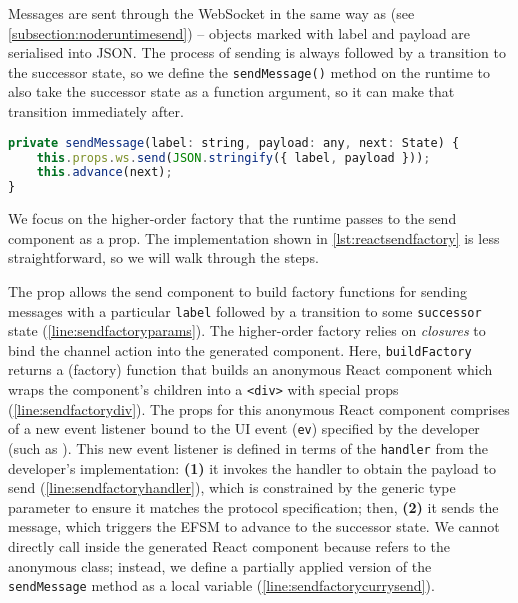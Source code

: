 Messages are sent through the WebSocket in the same way 
as \nodecodegen (see \cref{subsection:noderuntimesend}) 
-- objects marked with label and payload
are serialised into JSON. The process of sending is always followed
by a transition to the successor state, so we define the
\texttt{sendMessage()} method on the runtime to also take
the successor state as a function argument, so it can make that transition
immediately after.\\

\begin{lstlisting}[language=javascript,numbers=none]
private sendMessage(label: string, payload: any, next: State) {
	this.props.ws.send(JSON.stringify({ label, payload }));
	this.advance(next);
}
\end{lstlisting}

We focus on the higher-order factory that the runtime passes
to the send component as a prop. The implementation shown in
\cref{lst:reactsendfactory} is less straightforward,
so we will walk through the steps.

The prop allows the send component to build factory functions
for sending messages with a particular \texttt{label}
followed by a transition to some \texttt{successor} state
(\cref{line:sendfactoryparams}).
The higher-order factory relies on \textit{closures}
to bind the channel action into the generated component.
Here, \texttt{buildFactory} returns a (factory) function that
builds an anonymous React component which wraps the 
component's children into a \texttt{<div>} with special props 
(\cref{line:sendfactorydiv}).
The props for this anonymous React component comprises of a new
event listener bound to the UI event (\texttt{ev})
specified by the developer (such as ).
This new event listener is defined in terms of the
\texttt{handler} from the developer's implementation:
\textbf{(1)} it invokes the handler to obtain the payload to send 
(\cref{line:sendfactoryhandler}), which is constrained by
the generic type parameter to ensure it matches the protocol specification;
then, \textbf{(2)} it sends the message, which triggers the EFSM
to advance to the successor state.
We cannot directly call  inside
the generated React component because  refers
to the anonymous class; instead, we define a partially applied
version of the \texttt{sendMessage} method as a local variable 
(\cref{line:sendfactorycurrysend}).

